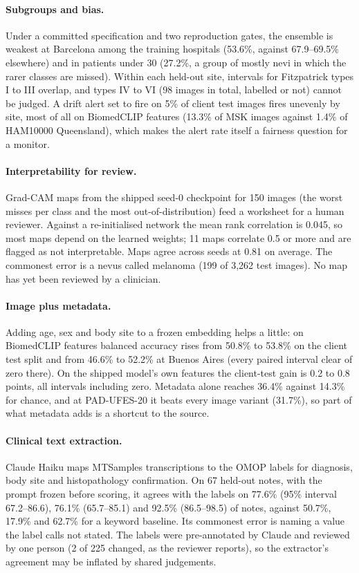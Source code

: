 \documentclass[11pt]{article}
\begin{document}
\paragraph{Subgroups and bias.} Under a committed specification and two reproduction gates, the
ensemble is weakest at Barcelona among the training hospitals (53.6\%, against 67.9--69.5\%
elsewhere) and in patients under 30 (27.2\%, a group of mostly nevi in which the rarer classes
are missed). Within each held-out site, intervals for Fitzpatrick types I to III overlap, and
types IV to VI (98 images in total, labelled or not) cannot be judged. A drift alert set to fire on 5\% of client
test images fires unevenly by site, most of all on BiomedCLIP features (13.3\% of MSK images
against 1.4\% of HAM10000 Queensland), which makes the alert rate itself a fairness question for
a monitor.

\paragraph{Interpretability for review.} Grad-CAM maps from the shipped seed-0 checkpoint for 150
images (the worst misses per class and the most out-of-distribution) feed a worksheet for a
human reviewer. Against a re-initialised network the mean rank correlation is 0.045, so most maps
depend on the learned weights; 11 maps correlate 0.5 or more and are flagged as not interpretable. Maps agree
across seeds at 0.81 on average. The commonest error is a nevus called melanoma (199 of 3{,}262
test images). No map has yet been reviewed by a clinician.

\paragraph{Image plus metadata.} Adding age, sex and body site to a frozen embedding helps a
little: on BiomedCLIP features balanced accuracy rises from 50.8\% to 53.8\% on the client test
split and from 46.6\% to 52.2\% at Buenos Aires (every paired interval clear of zero there). On
the shipped model's own features the client-test gain is 0.2 to 0.8 points, all intervals
including zero. Metadata alone reaches 36.4\% against 14.3\% for chance, and at PAD-UFES-20 it
beats every image variant (31.7\%), so part of what metadata adds is a shortcut to the source.

\paragraph{Clinical text extraction.} Claude Haiku maps MTSamples transcriptions to the OMOP
labels for diagnosis, body site and histopathology confirmation. On 67 held-out notes, with the
prompt frozen before scoring, it agrees with the labels on 77.6\% (95\% interval 67.2--86.6),
76.1\% (65.7--85.1) and 92.5\% (86.5--98.5) of notes, against 50.7\%, 17.9\% and 62.7\% for a
keyword baseline. Its commonest error is naming a value the label calls not stated. The labels
were pre-annotated by Claude and reviewed by one person (2 of 225 changed, as the reviewer reports), so the extractor's
agreement may be inflated by shared judgements.
\end{document}
